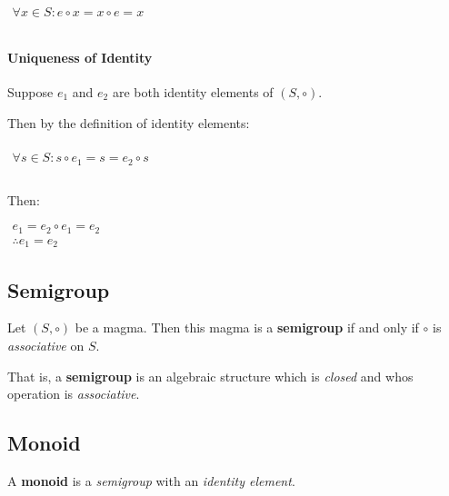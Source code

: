 \begin{math}
  \begin{array}{c}
    \\
    \forall x \in S: e \circ x = x \circ e =  x\\
    \\
  \end{array}
\end{math}


\paragraph{Uniqueness of Identity}

Suppose $e_1$ and $e_2$ are both identity elements of $(S, \circ)$.

Then by the definition of identity elements:

\begin{math}
  \begin{array}{c}
    \\
    \forall s \in S: s \circ e_1 = s = e_2 \circ s\\
    \\
  \end{array}
\end{math}

Then:

\begin{math}
  \begin{array}{c}
    e_1 = e_2 \circ e_1 = e_2 \\
    \therefore e_1 = e_2
  \end{array}
\end{math}



\subsection{Semigroup}
\label{sec:semigroup}

Let $(S, \circ)$ be a magma. Then this magma is a \textbf{semigroup}
if and only if $\circ$ is \textit{associative} on $S$.


That is, a \textbf{semigroup} is an algebraic structure which is
\textit{closed} and whos operation is \textit{associative}.


\subsection{Monoid}
\label{sec:monoid}

A \textbf{monoid} is a \textit{semigroup} with an \textit{identity
  element}.

